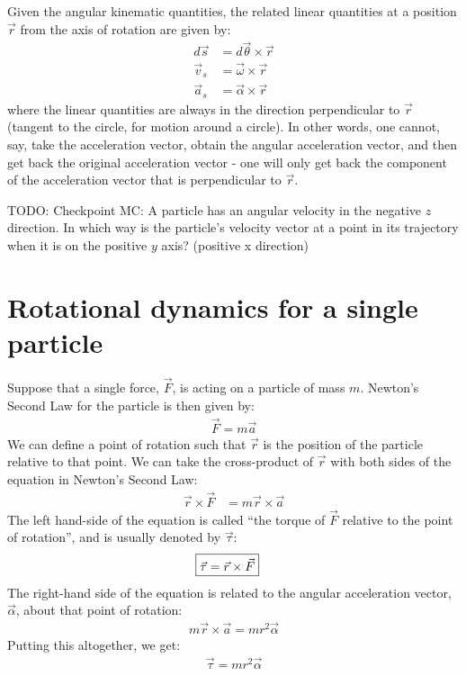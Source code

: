 Given the angular kinematic quantities, the related linear quantities at a position $\vec r$ from the axis of rotation are given by:
\begin{align}
d\vec s &= d\vec\theta \times \vec r\nonumber\\
\vec v_s &= \vec \omega \times \vec r\nonumber\\
\vec a_s&= \vec \alpha \times \vec r
\end{align}
where the linear quantities are always in the direction perpendicular to $\vec r$ (tangent to the circle, for motion around a circle). In other words, one cannot, say, take the acceleration vector, obtain the angular acceleration vector, and then get back the original acceleration vector - one will only get back the component of the acceleration vector that is perpendicular to $\vec r$.  

TODO: Checkpoint MC: A particle has an angular velocity in the negative $z$ direction. In which way is the particle's velocity vector at a point in its trajectory when it is on the positive $y$ axis? (positive x direction)

\section{Rotational dynamics for a single particle}
Suppose that a single force, $\vec F$, is acting on a particle of mass $m$.  Newton's Second Law for the particle is then given by:
\begin{align*}
\vec F = m \vec a
\end{align*}
We can define a point of rotation such that $\vec r$ is the position of the particle relative to that point. We can take the cross-product of $\vec r$ with both sides of the equation in Newton's Second Law:
\begin{align*}
\vec r \times \vec F &= m \vec r \times \vec a
\end{align*}
The left hand-side of the equation is called ``the torque of $\vec F$ relative to the point of rotation'', and is usually denoted by $\vec \tau$:
\begin{align}
\Aboxed{\vec \tau = \vec r \times \vec F}
\end{align}
The right-hand side of the equation is related to the angular acceleration vector, $\vec \alpha$, about that point of rotation:
\begin{align*}
 m \vec r \times \vec a = mr^2\vec\alpha
\end{align*}
Putting this altogether, we get:
\begin{align*}
\vec\tau = mr^2 \vec\alpha
\end{align*}

